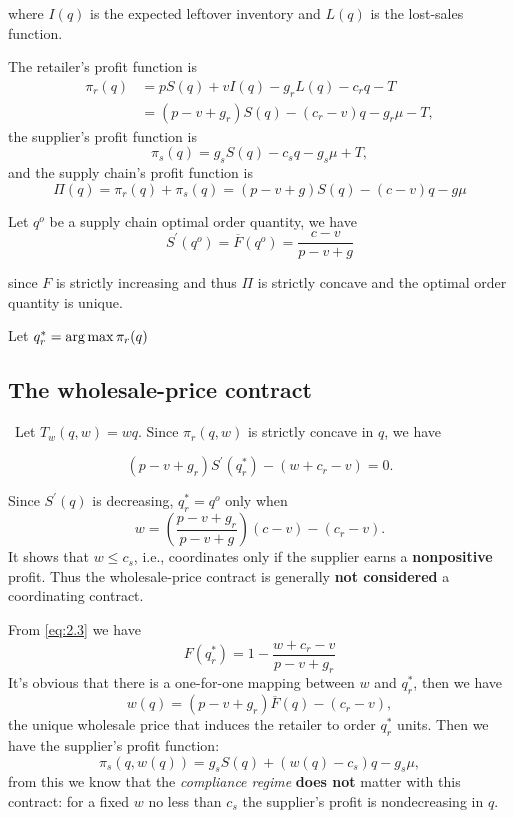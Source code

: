 where $I(q)$ is the expected leftover inventory and $L(q)$ is the lost-sales function.

The retailer's profit function is 
\begin{equation}\label{eq:retailer}\tag{Retailer}
    \begin{aligned}
        \pi_r(q)&=pS(q)+v I(q)-g_r L(q)-c_r q - T\\
    &=(p-v+g_r)S(q)-(c_r-v)q-g_r\mu-T,
    \end{aligned}
\end{equation}
the supplier's profit function is 
\begin{equation}\label{eq:supplier}\tag{Supplier}
    \pi_s(q)=g_s S(q)-c_s q-g_s\mu + T,
\end{equation}
and the supply chain's profit function is 
\begin{equation}\label{eq:2.1}
    \Pi(q)=\pi_r(q)+\pi_s(q)=(p-v+g)S(q)-(c-v)q-g\mu
\end{equation}

Let $q^o$ be a supply chain optimal order quantity, we have 
\begin{equation}
    S^\prime(q^o)=\overline F(q^o)=\frac{c-v}{p-v+g}
\end{equation}

since $F$ is strictly increasing and thus $\Pi$ is strictly concave and the optimal order quantity is unique.

Let $q_r^*=\operatorname*{arg\,max} \pi_r(q)$

\subsection{The wholesale-price contract}\
Let $T_w(q,w)=w q$. Since $\pi_r(q,w)$ is strictly concave in $q$, we have 

\begin{equation}\label{eq:2.3}
    (p-v+g_r)S^\prime(q_r^*)-(w+c_r-v)=0.
\end{equation}

Since $S^\prime(q)$ is decreasing, $q_r^*=q^o$ only when
$$
w=(\frac{p-v+g_r}{p-v+g})(c-v)-(c_r-v).
$$
It shows that $w\leq c_s$, i.e., coordinates only if the supplier earns a \textbf{nonpositive} profit. Thus the wholesale-price contract is generally \textbf{not considered} a coordinating contract.

From \autoref{eq:2.3} we have 
$$F(q_r^*)=1-\frac{w+c_r-v}{p-v+g_r}$$
It's obvious that there is a one-for-one mapping between $w$ and $q_r^*$, then we have $$w(q)=(p-v+g_r)\overline{F}(q)-(c_r-v),$$
the unique wholesale price that induces the retailer to order $q_r^*$ units.
Then we have the supplier's profit function:
\begin{equation}
    \pi_s(q,w(q))=g_s S(q)+(w(q)-c_s)q-g_s\mu\label{eq:2.4},
\end{equation}
from this we know that the \textit{compliance regime} \textbf{does not} matter with this contract: for a fixed $w$ no less than $c_s$ the supplier's profit  is nondecreasing in $q$.

